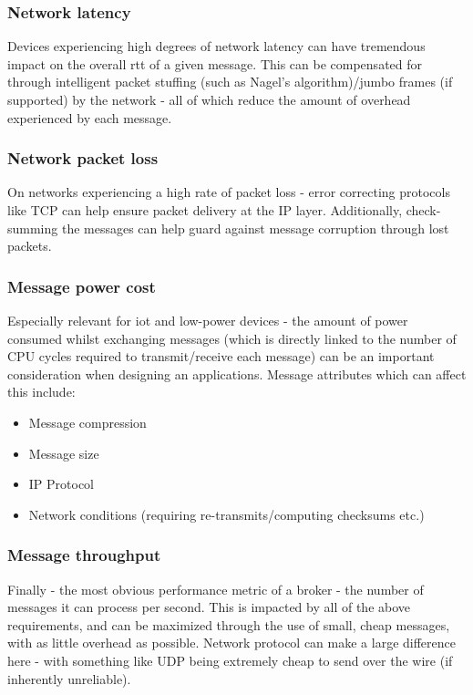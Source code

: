 \subsubsection{Network latency}
\label{subs:Network latency}

Devices experiencing high degrees of network latency can have tremendous impact
on the overall \gls{rtt} of a given message. This can be compensated for through
intelligent packet stuffing (such as Nagel's algorithm)/jumbo frames (if supported)
by the network - all of which reduce the amount of overhead experienced by each
message.

\subsubsection{Network packet loss}
\label{subs:Network packet loss}

On networks experiencing a high rate of packet loss - error correcting protocols
like TCP can help ensure packet delivery at the IP layer. Additionally,
check-summing the messages can help guard against message corruption through lost
packets.

\subsubsection{Message power cost}
\label{subs:Message power cost}

Especially relevant for \gls{iot} and low-power devices - the amount of power
consumed whilst exchanging messages (which is directly linked to the number of
CPU cycles required to transmit/receive each message) can be an important
consideration when designing an applications. Message attributes which can
affect this include:

\begin{itemize}
  \item Message compression
  \item Message size
  \item IP Protocol
  \item Network conditions (requiring re-transmits/computing checksums etc.)
\end{itemize}

\subsubsection{Message throughput}
\label{subs:Message throughput}

Finally - the most obvious performance metric of a broker - the number of messages
it can process per second. This is impacted by all of the above requirements,
and can be maximized through the use of small, cheap messages, with as little
overhead as possible. Network protocol can make a large difference here - with
something like UDP being extremely cheap to send over the wire
(if inherently unreliable).

